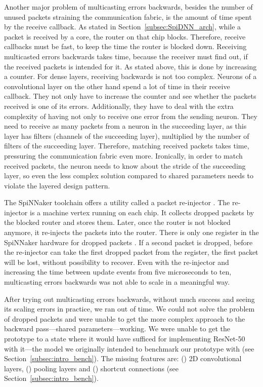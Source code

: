 \documentclass[]{article}
\begin{document}
Another major problem of multicasting errors backwards, besides the
number of unused packets straining the communication fabric, is
the amount of time spent by the receive callback.
As stated in Section~\ref{subsec:SpiDNN_arch}, while a packet is
received by a core, the router on that chip blocks.
Therefore, receive callbacks must be fast, to keep the time the router
is blocked down.
Receiving multicasted errors backwards takes time, because the
receiver must find out, if the received packets is intended for
it.
As stated above, this is done by increasing a counter.
For dense layers, receiving backwards is not too complex.
Neurons of a convolutional layer on the other hand spend a lot of
time in their receive callback.
They not only have to increase the counter and see whether the
packets received is one of its errors.
Additionally, they have to deal with the extra complexity of having
not only to receive one error from the sending neuron.
They need to receive as many packets from a neuron in the succeeding
layer, as this layer has filters (channels of the succeeding layer),
multiplied by the number of filters of the succeeding layer.
Therefore, matching received packets takes time, pressuring the
communication fabric even more.
Ironically, in order to match received packets, the neuron needs to
know about the stride of the succeeding layer, so even the less
complex solution compared to shared parameters needs to violate
the layered design pattern.

The SpiNNaker toolchain offers a utility called a packet re-injector
\citep{furber_et_al_2020}.
The re-injector is a machine vertex running on each chip.
It collects dropped packets by the blocked router and stores them.
Later, once the router is not blocked anymore, it re-injects the
packets into the router.
There is only one register in the SpiNNaker hardware for dropped
packets \citep{furber_et_al_2020}.
If a second packet is dropped, before the re-injector can take the
first dropped packet from the register, the first packet will be lost,
without possibility to recover.
Even with the re-injector and increasing the time between update
events from five microseconds to ten, multicasting errors backwards
was not able to scale in a meaningful way.

After trying out multicasting errors backwards, without much success
and seeing its scaling errors in practice, we ran out of time.
We could not solve the problem of dropped packets and were unable to
get the more complex approach to the backward pass---shared
parameters---working.
We were unable to get the prototype to a state where it would have
sufficed for implementing ResNet-50 with it---the model we originally
intended to benchmark our prototype with
(see Section~\ref{subsec:intro_bench}).
The missing features are: () 2D convolutional layers,
() pooling layers and () shortcut
connections (see Section~\ref{subsec:intro_bench}).
\end{document}
